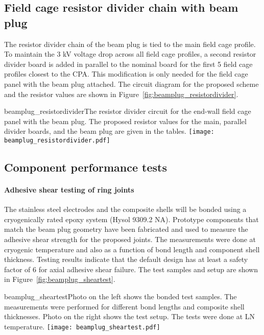 \subsection{Field cage resistor divider chain with beam plug}
The resistor divider chain of the beam plug is tied to the main field cage profile. To maintain the 3 kV voltage drop across all field cage profiles, a second resistor divider board is added in parallel to the nominal board for the first 5 field cage profiles closest to the CPA. This modification is only needed for the field cage panel with the beam plug attached. The circuit diagram for the proposed scheme and the resistor values are shown in Figure~\ref{fig:beamplug_resistordivider}.
\begin{cdrfigure}{beamplug_resistordivider}{The resistor divider circuit for the end-wall field cage panel with the beam plug. The proposed resistor values for the main, parallel divider boards, and the beam plug are given in the tables.}
  \texttt{[image: beamplug\_resistordivider.pdf]}
\end{cdrfigure}

\subsection{Component performance tests}

\paragraph{Adhesive shear testing of ring joints}
The stainless steel electrodes and the composite shells will be bonded using a cryogenically rated epoxy system (Hysol 9309.2 NA). Prototype components that match the beam plug geometry have been fabricated and used to measure the adhesive shear strength for the proposed joints. The measurements were done at cryogenic temperature and also as a function of bond length and component shell thickness. 
Testing results indicate that the default design has at least a safety factor of 6 for axial adhesive shear failure. The test samples and setup are shown in Figure~\ref{fig:beamplug_sheartest}.

\begin{cdrfigure}{beamplug_sheartest}{Photo on the left shows the bonded test samples. The measurements were performed for different bond lengths and composite shell thicknesses. Photo on the right shows the test setup. The tests were done at LN temperature.}
  \texttt{[image: beamplug\_sheartest.pdf]}
\end{cdrfigure}

